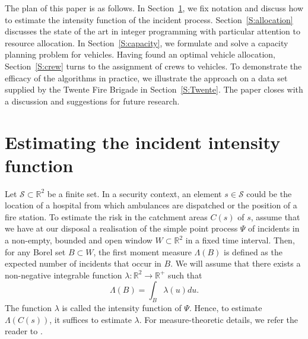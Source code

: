 \documentclass[twoside,11pt]{article}
\begin{document}
The plan of this paper is as follows. In Section~\ref{S:intensity},
we fix notation and discuss how to estimate the intensity function 
of the incident process. Section~\ref{S:allocation} discusses the 
state of the art in integer programming with particular attention
to resource allocation. In Section~\ref{S:capacity}, we formulate and
solve a capacity planning problem for vehicles. Having found an
optimal vehicle allocation, Section~\ref{S:crew} turns to the 
assignment of crews to vehicles. To demonstrate the efficacy of 
the algorithms in practice, we illustrate the approach on a data 
set supplied by the Twente Fire Brigade in Section~\ref{S:Twente}.
The paper closes with a discussion and suggestions for future research.

\section{Estimating the incident intensity function}
\label{S:intensity}

Let $\mathcal{S} \subset \mathbb{R}^2$ be a finite set. In a security
context, an element $s\in \mathcal{S}$ could be the location of 
a hospital from which ambulances are dispatched or the position of 
a fire station. To estimate the risk in the catchment areas $C(s)$
of $s$, assume that we have at our disposal a realisation of the 
simple point process $\Psi$ of incidents 
in a non-empty, bounded and open window $W \subset \mathbb{R}^2$ in a 
fixed time interval. Then, for any Borel set $B\subset W$, the first moment 
measure $\Lambda(B)$ is defined as the expected number of incidents that 
occur in $B$. We will assume that there exists a non-negative integrable 
function $\lambda: \mathbb{R}^2 \to \mathbb{R}^+$ such that 
\[
\Lambda(B) = \int_B \lambda(u) du.
\]
The function $\lambda$ is called the intensity function of $\Psi$.
Hence, to estimate $\Lambda( C(s) )$, it suffices to estimate $\lambda$.
For measure-theoretic details, we refer the reader to \citet{SKM}.
\end{document}
